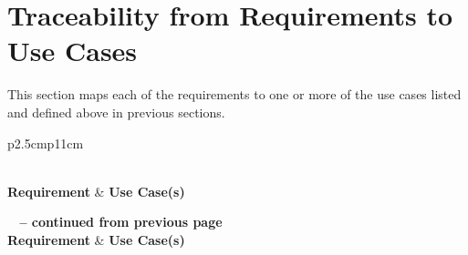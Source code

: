 \documentclass[12pt]{article}
\begin{document}
\section{Traceability from Requirements to Use Cases}
This section maps each of the requirements to one or more of the use cases listed and defined above in previous sections.
\begin{longtable}{p{2.5cm}p{11cm}}
    \caption{Traceability from Requirements to Use Cases}\label{tab:req_uc}\\
    \toprule
    \textbf{Requirement} & \textbf{Use Case(s)} \\
    \midrule
    \endfirsthead
    
    {{\bfseries \tablename\ \thetable{} -- continued from previous page}} \\
    \toprule
    \textbf{Requirement} & \textbf{Use Case(s)} \\
    \midrule
    \endhead
    
    \midrule
     \\
    \endfoot
    
    \bottomrule
    \endlastfoot


\end{longtable}
\end{document}
